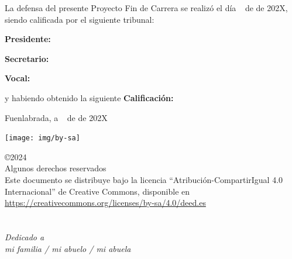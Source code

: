 \documentclass[a4paper, 12pt]{book}
\makeatletter
\let\theauthor\@author
\makeatother
\begin{document}
\vspace{0.8cm}
La defensa del presente Proyecto Fin de Carrera se realizó el día \qquad$\;\,$ de \qquad\qquad\qquad\qquad \newline de 202X, siendo calificada por el siguiente tribunal:


\vspace{0.5cm}
\textbf{Presidente:}

\vspace{1cm}
\textbf{Secretario:}

\vspace{1cm}
\textbf{Vocal:}


\vspace{1cm}
y habiendo obtenido la siguiente \textbf{Calificación:}


\vspace{1cm}
\begin{flushright}
Fuenlabrada, a \qquad$\;\,$ de \qquad\qquad\qquad\qquad de 202X
\end{flushright}

\vspace{1cm}

\texttt{[image: img/by-sa]}

\noindent©2024 \theauthor  \\
Algunos derechos reservados  \\
Este documento se distribuye bajo la licencia ``Atribución-CompartirIgual 4.0 Internacional'' de Creative Commons, disponible en \\
\url{https://creativecommons.org/licenses/by-sa/4.0/deed.es}



\chapter*{}
\begin{flushright}
\textit{Dedicado a \\
mi familia / mi abuelo / mi abuela}
\end{flushright}

\end{document}
